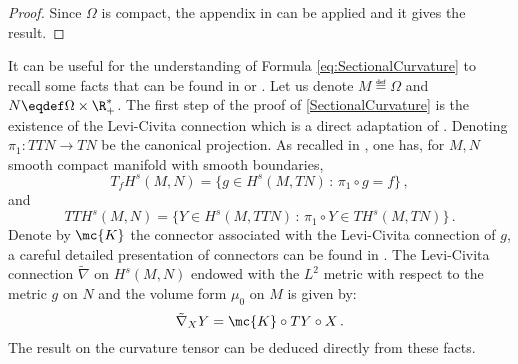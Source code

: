 \begin{proof}
Since $\Omega$ is compact, the appendix in \cite{freed1989} can be applied and it gives the result.
\end{proof}

\begin{remark}
It can be useful for the understanding of Formula \eqref{eq:SectionalCurvature} to recall some facts that can be found in \cite{em70} or \cite{MisiolekCurvature}.
Let us denote $M\eqdef \Omega$ and $N \eqdef \Omega \times \R_+^*$. 
The first step of the proof of \ref{SectionalCurvature} is the existence of the Levi-Civita connection which is a direct adaptation of \cite[Section 9]{em70}. Denoting $\pi_1: TTN \to TN$ be the canonical projection.  As recalled in \cite[Section 2]{em70}, one has, for $M,N$ smooth compact manifold with smooth boundaries,
\begin{equation*}
T_fH^s(M,N) = \{  g \in H^s(M,TN) \, : \, \pi_1 \circ g = f\}\,,
\end{equation*}
and
\begin{equation*}
TTH^s(M,N) = \{  Y \in H^s(M,TTN) \, : \, \pi_1 \circ Y \in TH^s(M,TN)\}\,.
\end{equation*}
Denote by $\mc{K}$ the connector associated with the Levi-Civita connection of $g$, a careful detailed presentation of connectors can be found in \cite{ArthurBesse2}.
The Levi-Civita connection $\tilde \nabla$ on $H^s(M, N)$ endowed with the $L^2$ metric with respect to the metric $g$ on $N$ and the volume form $\mu_0$ on $M$ is given by:
\begin{equation}
\tilde \nabla_X Y = \mc{K} \circ TY \circ X\,.
\end{equation}
The result on the curvature tensor can be deduced directly from these facts. 
\end{remark}
%
%



